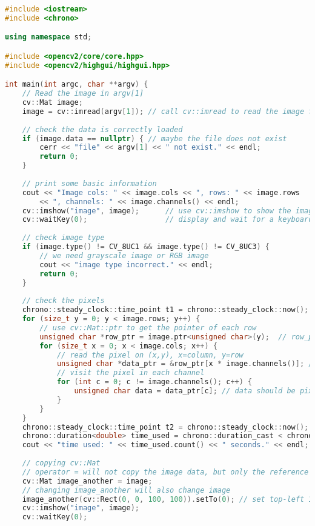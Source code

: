 \begin{lstlisting}[language=C++,caption=slambook/ch5/imageBasics/imageBasics.cpp]
#include <iostream>
#include <chrono>

using namespace std;

#include <opencv2/core/core.hpp>
#include <opencv2/highgui/highgui.hpp>

int main(int argc, char **argv) {
    // Read the image in argv[1]
    cv::Mat image;
    image = cv::imread(argv[1]); // call cv::imread to read the image from file
    
    // check the data is correctly loaded
    if (image.data == nullptr) { // maybe the file does not exist
        cerr << "file" << argv[1] << " not exist." << endl;
        return 0;
    }
    
    // print some basic information
    cout << "Image cols: " << image.cols << ", rows: " << image.rows 
	    << ", channels: " << image.channels() << endl;
    cv::imshow("image", image);      // use cv::imshow to show the image
    cv::waitKey(0);                  // display and wait for a keyboard input
    
    // check image type
    if (image.type() != CV_8UC1 && image.type() != CV_8UC3) {
        // we need grayscale image or RGB image
        cout << "image type incorrect." << endl;
        return 0;
    }
    
    // check the pixels
    chrono::steady_clock::time_point t1 = chrono::steady_clock::now();
    for (size_t y = 0; y < image.rows; y++) {
        // use cv::Mat::ptr to get the pointer of each row
        unsigned char *row_ptr = image.ptr<unsigned char>(y);  // row_ptr is the pointer to y-th row
        for (size_t x = 0; x < image.cols; x++) {
            // read the pixel on (x,y), x=column, y=row
            unsigned char *data_ptr = &row_ptr[x * image.channels()]; // data_ptr is the pointer to (x,y)
            // visit the pixel in each channel
            for (int c = 0; c != image.channels(); c++) {
                unsigned char data = data_ptr[c]; // data should be pixel of I(x,y) in c-th channel
            }
        }
    }
    chrono::steady_clock::time_point t2 = chrono::steady_clock::now();
    chrono::duration<double> time_used = chrono::duration_cast < chrono::duration < double >> (t2 - t1);
    cout << "time used: " << time_used.count() << " seconds." << endl;
    
    // copying cv::Mat
    // operator = will not copy the image data, but only the reference
    cv::Mat image_another = image;
    // changing image_another will also change image 
    image_another(cv::Rect(0, 0, 100, 100)).setTo(0); // set top-left 100*100 block to zero
    cv::imshow("image", image);
    cv::waitKey(0);
    

\end{lstlisting}

